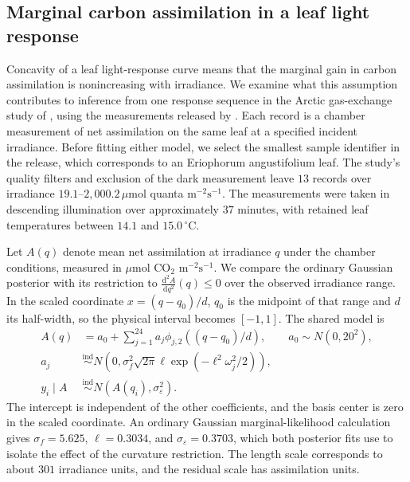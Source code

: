 \subsection{Marginal carbon assimilation in a leaf light response}\label{sec:application}

Concavity of a leaf light-response curve means that the marginal gain
in carbon assimilation is nonincreasing with irradiance. We examine
what this assumption contributes to inference from one response sequence
in the Arctic gas-exchange study of \citet{rogers2019arctic}, using
the measurements released by \citet{rogers2019data}. Each record is a
chamber measurement of net assimilation on the same leaf at a specified
incident irradiance. Before fitting either model, we select the smallest
sample identifier in the release, which corresponds to an
Eriophorum angustifolium leaf. The study's quality filters and
exclusion of the dark measurement leave $13$ records over irradiance
$19.1$--$2{,}000.2\,\mu\mathrm{mol}$ quanta $\mathrm m^{-2}\mathrm s^{-1}$.
The measurements were taken in descending illumination over approximately
$37$ minutes, with retained leaf temperatures between $14.1$ and
$15.0\,{}^\circ\mathrm C$.

Let $A(q)$ denote mean net assimilation at irradiance $q$ under the
chamber conditions, measured in $\mu\mathrm{mol}$ $\mathrm{CO}_2$
$\mathrm m^{-2}\mathrm s^{-1}$. We compare the ordinary Gaussian
posterior with its restriction to $\frac{\mathrm{d}^2A}{\mathrm{d}q^2}(q)\leq0$ over the observed
irradiance range. In the scaled coordinate $x=(q-q_0)/d$,
$q_0$ is the midpoint of that range and $d$ its half-width, so the
physical interval becomes $[-1,1]$. The shared model is
\begin{equation}\label{eq:application-model}
\begin{aligned}
 A(q)&=a_0+\sum_{j=1}^{24}a_j\phi_{j,2}((q-q_0)/d),\qquad
 a_0\sim N(0,20^2),\\
 a_j&\overset{\mathrm{ind}}\sim
 N\left(0,\sigma_f^2\sqrt{2\pi}\ell
           \exp(-\ell^2\omega_j^2/2)\right),\\
 y_i\mid A&\overset{\mathrm{ind}}\sim N(A(q_i),\sigma_\varepsilon^2).
\end{aligned}
\end{equation}
The intercept is independent of the other coefficients, and the basis
center is zero in the scaled coordinate. An ordinary Gaussian
marginal-likelihood calculation gives
$\sigma_f=5.625$, $\ell=0.3034$, and $\sigma_\varepsilon=0.3703$,
which both posterior fits use to isolate the effect of the curvature
restriction. The length scale
corresponds to about $301$ irradiance units, and the residual scale has
assimilation units.

